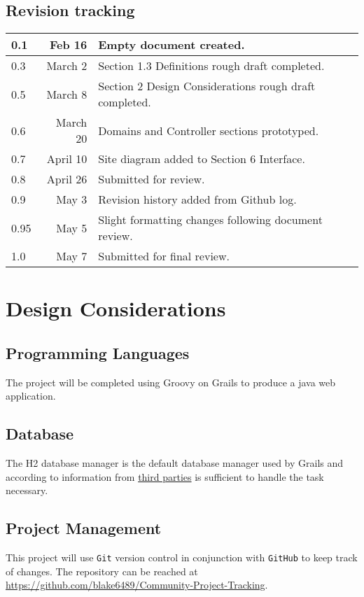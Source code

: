 \documentclass[12pt]{article}
\newcommand{\e}[1] {{\tt #1}}
\begin{document}
\subsection{Revision tracking}
\begin{tabular}{|l|r|p{4.6in}|}
\hline
0.1 & Feb 16 & Empty document created.\\
\hline
0.3 & March 2 & Section 1.3 Definitions rough draft completed.\\
\hline
0.5 & March 8 & Section 2 Design Considerations rough draft completed.\\
\hline
0.6 & March 20 & Domains and Controller sections prototyped.\\
\hline
0.7 & April 10 & Site diagram added to Section 6 Interface.\\
\hline
0.8 & April 26 & Submitted for review.\\
\hline
0.9 & May 3 & Revision history added from Github log.\\
\hline
0.95 & May 5 & Slight formatting changes following document review.\\
\hline
1.0 & May 7 & Submitted for final review.\\
\hline
\end{tabular}

\section{Design Considerations}

\subsection{Programming Languages}
The project will be completed using Groovy on Grails to produce a java web application. 

\subsection{Database}
The H2 database manager is the default database manager used by Grails and according to information from \href{http://database-management-systems.findthebest.com/compare/16-30/H2-vs-MySQL}{third parties} is sufficient to handle the task necessary.

\subsection{Project Management}
This project will use \e{Git} version control in conjunction with \e{GitHub} to keep track of changes. The repository can be reached at \url{https://github.com/blake6489/Community-Project-Tracking}.
\end{document}
